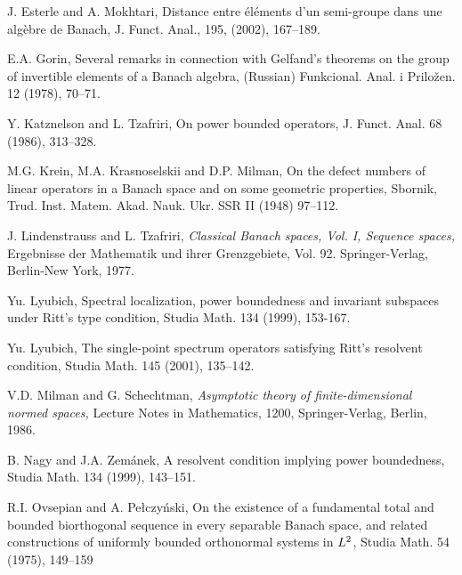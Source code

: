 \documentclass[12pt]{amsart}
\begin{document}
\begin{thebibliography}{999}
J. Esterle and A. Mokhtari, Distance entre \'el\'ements d'un semi-groupe dans
une alg\`ebre de Banach, J. Funct. Anal.,
195, (2002), 167--189.



 E.A. Gorin,  Several remarks in connection with Gelfand's
theorems on the group
   of invertible elements of a Banach algebra, (Russian)
Funkcional. Anal. i Prilo\v zen. 12 (1978),
   70--71.

Y. Katznelson and L. Tzafriri,
On power bounded operators,
J. Funct. Anal. 68 (1986), 313--328.

 M.G. Krein, M.A. Krasnoselskii and D.P. Milman, On
the defect numbers of linear operators in a Banach space and on
some geometric properties, Sbornik, Trud. Inst. Matem. Akad. Nauk.
Ukr. SSR II (1948) 97--112.

J. Lindenstrauss and L. Tzafriri, {\it Classical Banach spaces,
Vol. I, Sequence spaces,} Ergebnisse der Mathematik und ihrer
Grenzgebiete, Vol. 92. Springer-Verlag, Berlin-New York, 1977.

Yu. Lyubich,
Spectral localization, power boundedness and invariant subspaces
under Ritt's type condition, Studia Math. 134 (1999), 153-167.

Yu. Lyubich,  The single-point spectrum operators satisfying
Ritt's resolvent condition, Studia Math.  145  (2001), 135--142.

 V.D. Milman and G. Schechtman, {\it Asymptotic theory of
finite-dimensional normed
   spaces,}  Lecture Notes in Mathematics, 1200, Springer-Verlag, Berlin,
   1986.








B. Nagy and J.A. Zem\'anek, A resolvent condition
implying power boundedness,  Studia Math.  134  (1999), 143--151.



  R.I. Ovsepian and A. Pe\l czy\'nski, On the existence of a fundamental total and
   bounded biorthogonal sequence in every separable Banach space, and related constructions of uniformly
   bounded orthonormal systems in $L\sp{2}$, Studia Math. 54 (1975),  149--159


\end{thebibliography}
\end{document}
